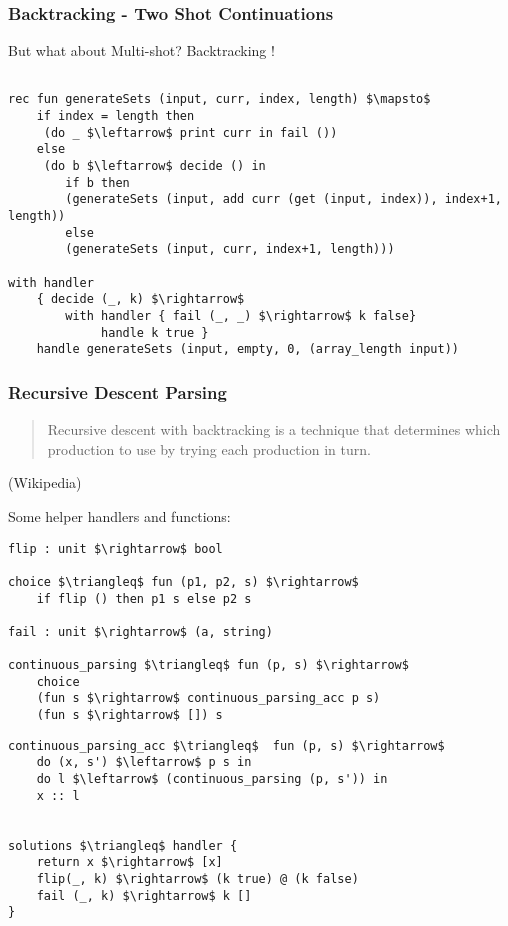 \documentclass[t]{beamer}
\begin{document}
\begin{frame}[fragile]
	\frametitle{Backtracking - Two Shot Continuations}
	
	But \alert{what about Multi-shot}?
	Backtracking !
	\begin{lstlisting}[language=pratner, mathescape=true, basicstyle=\scriptsize,lineskip=-2pt, aboveskip=0pt, belowskip=0pt, columns=fullflexible]

rec fun generateSets (input, curr, index, length) $\mapsto$ 
	if index = length then
	 (do _ $\leftarrow$ print curr in fail ())
	else 
	 (do b $\leftarrow$ decide () in
		if b then  
		(generateSets (input, add curr (get (input, index)), index+1, length))
		else 
		(generateSets (input, curr, index+1, length)))
		
with handler 
	{ decide (_, k) $\rightarrow$ 
		with handler { fail (_, _) $\rightarrow$ k false}
			 handle k true } 
	handle generateSets (input, empty, 0, (array_length input))
	\end{lstlisting}
\end{frame}

\begin{frame}[fragile]
	\frametitle{Recursive Descent Parsing}
	\vspace{10pt}
	\begin{quote}
		Recursive descent with \alert{backtracking} is a technique that determines which production to use by trying each production in turn.
	\end{quote} (Wikipedia)
	
	Some helper handlers and functions:
	
	\begin{multicols}{2}
	
	\begin{lstlisting}[language=pratner, mathescape=true, basicstyle=\scriptsize, aboveskip=0pt, belowskip=0pt, columns=fullflexible]
flip : unit $\rightarrow$ bool

choice $\triangleq$ fun (p1, p2, s) $\rightarrow$
    if flip () then p1 s else p2 s

fail : unit $\rightarrow$ (a, string)			
		
continuous_parsing $\triangleq$ fun (p, s) $\rightarrow$ 
    choice 
    (fun s $\rightarrow$ continuous_parsing_acc p s) 
    (fun s $\rightarrow$ []) s
	\end{lstlisting}

	
	\columnbreak
	
	\begin{lstlisting}[language=pratner, mathescape=true, basicstyle=\scriptsize, aboveskip=0pt, belowskip=0pt, columns=fullflexible]
continuous_parsing_acc $\triangleq$  fun (p, s) $\rightarrow$
	do (x, s') $\leftarrow$ p s in
	do l $\leftarrow$ (continuous_parsing (p, s')) in
	x :: l
	
	
solutions $\triangleq$ handler {
	return x $\rightarrow$ [x]
	flip(_, k) $\rightarrow$ (k true) @ (k false)
	fail (_, k) $\rightarrow$ k []
}
	\end{lstlisting}
	
	
	\end{multicols}
	
\end{frame}
\end{document}
